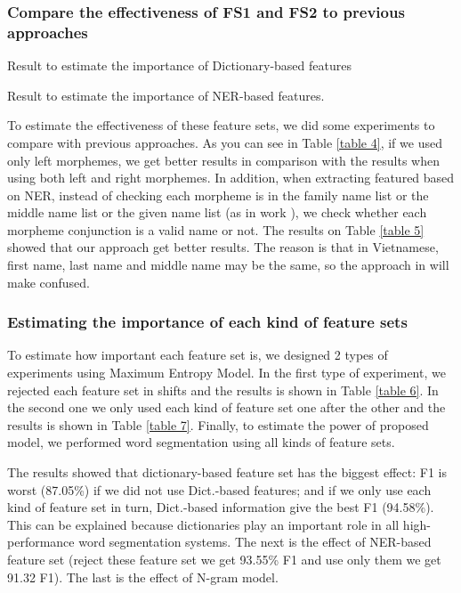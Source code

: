 \documentclass[english]{jnlp_1.4}
\begin{document}
\subsubsection{Compare the effectiveness of FS1 and FS2 to previous approaches}

\begin{table}[b]
\caption{Result to estimate the importance of Dictionary-based features}
\label{table 4}

\end{table}
\begin{table}[b]
\caption{Result to estimate the importance of NER-based features.}
\label{table 5}

\end{table}

To estimate the effectiveness of these feature sets, we did some experiments to compare with previous approaches.
As you can see in Table \ref{table 4}, if we used only left morphemes, we get better results in
comparison with the results when using both left and right morphemes.
	In addition, when extracting featured based on NER, instead of checking each morpheme is in the family name list
or the middle name list or the given name list (as in work \cite{CamTu07}), we check whether each morpheme
conjunction is a valid name or not. The results on Table \ref{table 5} showed that our approach get better results.
The reason is that in Vietnamese, first name, last name and middle name may be the same, so the approach in
\cite{CamTu07} will make confused.




\subsubsection{Estimating the importance of each kind of feature sets}

To estimate how important each feature set is, we designed 2 types of experiments using Maximum Entropy Model.
In the first type of experiment, we rejected each feature set in shifts and the results is shown in Table \ref{table 6}.
In the second one we only used each kind of
feature set one after the other and the results is shown in Table \ref{table 7}.
Finally, to estimate the power of proposed model, we performed word
segmentation using all kinds of feature sets.

The results showed that dictionary-based feature set has the biggest effect: F1 is worst (87.05\%) if we
did not use Dict.-based features; and if we only use each kind of
feature set in turn, Dict.-based information give the best F1 (94.58\%).
This can be explained because dictionaries play an important role in all high-performance word segmentation systems.
The next is the effect of NER-based feature set (reject these feature set we get 93.55\% F1 and use only them we get 91.32 F1). The last is the effect of N-gram model.
\end{document}
